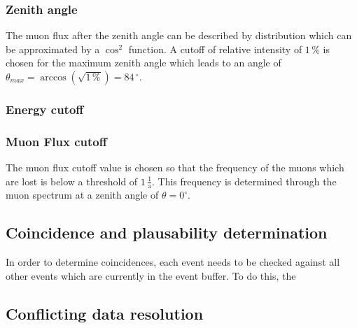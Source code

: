 \documentclass[abstract,toc,los,english,11pt,glossaries]{jluthesis}
\begin{document}
\subsubsection*{Zenith angle}
The muon flux after the zenith angle can be described by  distribution\cite{muonenergyspectrum} which can be approximated by a $\cos^2$ function. A cutoff of relative intensity of $1\,\%$ is chosen for the maximum zenith angle which leads to an angle of $\theta_{max} = \arccos\left(\sqrt{1\,\%}\right) = 84\,^\circ$.
\subsubsection*{Energy cutoff}
\subsubsection*{Muon Flux cutoff}
The muon flux cutoff value is chosen so that the frequency of the muons which are lost is below a threshold of $1\,\frac{1}{\text{a}}$. This frequency is determined through the muon spectrum\cite{muonenergyspectrum} at a zenith angle of $\theta = 0^{\circ}$. 
\subsection{Coincidence and plausability determination}
In order to determine coincidences, each event needs to be checked against all other events which are currently in the event buffer. To do this, the
\subsection{Conflicting data resolution}
\clearpage 
\end{document}
